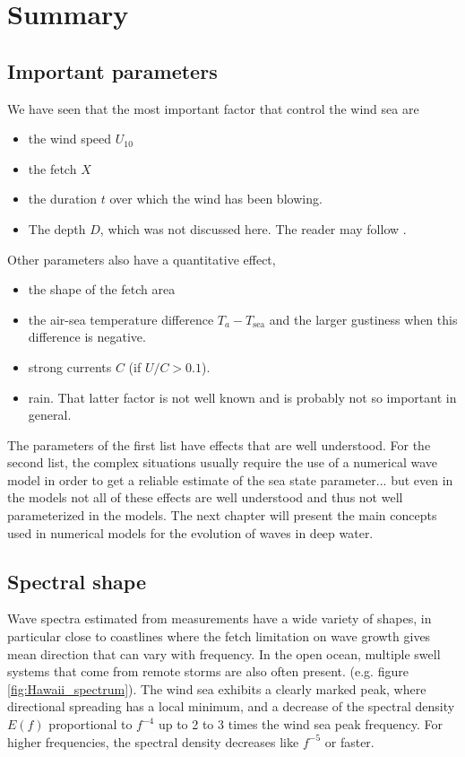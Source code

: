 \section{Summary}
\subsection{Important parameters}
 We have seen that the most important factor that control the wind sea are 
\begin{itemize}
  \item the wind speed $U_{10}$
  \item the fetch  $X$
  \item the duration $t$ over which the wind has been blowing.
 \item The depth $D$, which was not discussed here. The reader may follow \cite{Young1999}. 
 \end{itemize}
Other parameters also have a quantitative effect, 
\begin{itemize}
  \item the shape of the fetch area 
  \item the air-sea temperature difference $T_a - T_{\mathrm{sea}}$ and the larger gustiness when this difference is negative. 
  \item strong currents $C$ (if $U/C > 0.1$).
  \item rain. That latter factor is not well known and is probably not so important in general. 
\end{itemize}

The parameters of the first list have effects that are well understood. For the second list, the complex situations usually require 
the use of a numerical wave model in order to get a reliable estimate of the sea state parameter... but even in the models 
not all of these effects are well understood and thus not well parameterized in the models. The next chapter will present 
the main concepts used in numerical models for the evolution of waves in deep water. 

\subsection{Spectral shape}
Wave spectra estimated from measurements have a wide variety of shapes, in particular close to coastlines 
where the fetch limitation on wave growth gives mean direction that can vary with frequency. 
In the open ocean, multiple swell systems that come from remote storms are also often present.  (e.g. figure \ref{fig:Hawaii_spectrum}). 
The wind sea exhibits a clearly marked peak, where directional spreading has a local minimum, and a decrease of the spectral density $E(f)$ 
proportional to  $f^{-4}$ up to 2 to 3 times the wind sea peak frequency. For higher frequencies, the spectral density decreases like $f^{-5}$ or faster. 

